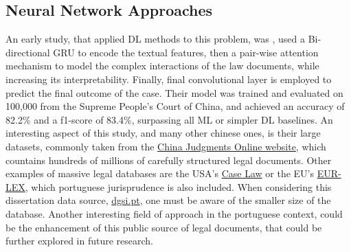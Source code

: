 \documentclass[11pt,a4paper,twoside,openright]{book}
\begin{document}
\subsection{Neural Network Approaches}
An early study, that applied DL methods to this problem, was \textcite{long_automatic_2018},
used a Bi-directional GRU to encode the textual features, then a pair-wise attention mechanism to model the complex interactions of the
law documents, while increasing its interpretability. Finally, final convolutional layer is employed to predict the final outcome of the case.
Their model was  trained and evaluated on 100,000 from the Supreme People's Court  of China,
and achieved an accuracy of 82.2\% and a f1-score of 83.4\%, surpassing all ML or simpler DL baselines.
An interesting aspect of this study, and many other chinese ones, is their large datasets, commonly taken from the
\href{https://wenshu.court.gov.cn/}{China Judgments Online website}, which countains hundreds of millions of carefully structured legal documents. 
Other examples of massive legal databases are the USA's \href{https://case.law/}{Case Law} or the EU's \href{https://eur-lex.europa.eu/}{EUR-LEX}, which portuguese jurisprudence is also included.
When considering this dissertation data source, \href{https://www.dgsi.pt/}{dgsi.pt}, one must be aware of the smaller size of the database. 
Another interesting field of approach in the portuguese context, could be the enhancement of this public source of legal documents, that could be further explored in future research.
\end{document}
